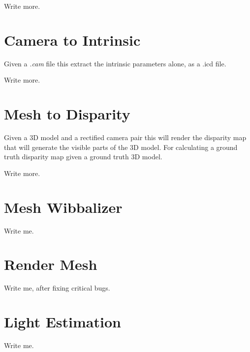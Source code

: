\documentclass[10pt,a4paper,twoside]{article}
\begin{document}
Write more.



\section{Camera to Intrinsic}
Given a \emph{.cam} file this extract the intrinsic parameters alone, as a {.icd} file.

Write more.



\section{Mesh to Disparity}
Given a 3D model and a rectified camera pair this will render the disparity map that will generate the visible parts of the 3D model. For calculating a ground truth disparity map given a ground truth 3D model.

Write more.



\section{Mesh Wibbalizer}
Write me.



\section{Render Mesh}
Write me, after fixing critical bugs.






\section{Light Estimation}
Write me.






\end{document}

